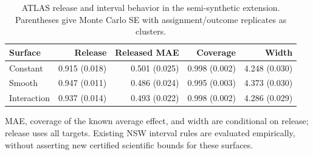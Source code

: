 \begin{table}[htbp]
\centering\small
\setlength{\tabcolsep}{4pt}
\caption{ATLAS release and interval behavior in the semi-synthetic extension. Parentheses give Monte Carlo SE with assignment/outcome replicates as clusters.}
\label{tab:ext-calibration}
\begin{tabular}{lrrrr}
\toprule
Surface & Release & Released MAE & Coverage & Width \\
\midrule
Constant & 0.915 (0.018) & 0.501 (0.025) & 0.998 (0.002) & 4.248 (0.030) \\
Smooth & 0.947 (0.011) & 0.486 (0.024) & 0.995 (0.003) & 4.373 (0.030) \\
Interaction & 0.937 (0.014) & 0.493 (0.022) & 0.998 (0.002) & 4.286 (0.029) \\
\bottomrule
\end{tabular}
\par\smallskip\begin{minipage}{0.97\linewidth}\footnotesize MAE, coverage of the known average effect, and width are conditional on release; release uses all targets. Existing NSW interval rules are evaluated empirically, without asserting new certified scientific bounds for these surfaces.\end{minipage}
\end{table}
